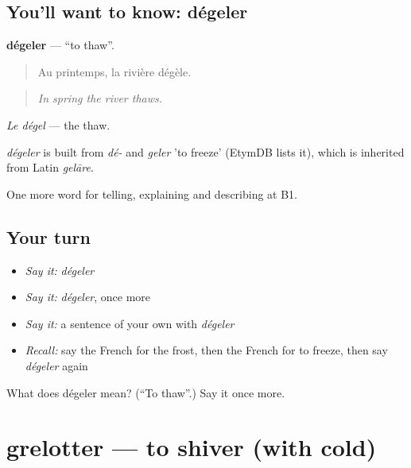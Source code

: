 \subsection*{You'll want to know: dégeler}
\textbf{dégeler} — \textquotedblleft{}to thaw\textquotedblright{}.

\begin{quote}
Au printemps, la rivière dégèle.
\end{quote}

\begin{quote}
\emph{In spring the river thaws.}
\end{quote}

\emph{Le dégel} — the thaw.

\begin{cousinweb}
\emph{dégeler} is built from \emph{dé-} and \emph{geler} 'to freeze' (EtymDB lists it), which is inherited from Latin \emph{gelāre}.
\end{cousinweb}

\begin{grammarlens}[title={What you've built}]
One more word for telling, explaining and describing at B1.
\end{grammarlens}

\subsection*{Your turn}
\begin{itemize}
\raggedright
  \item \emph{Say it:} \emph{dégeler}
  \item \emph{Say it:} \emph{dégeler}, once more
  \item \emph{Say it:} a sentence of your own with \emph{dégeler}
  \item \emph{Recall:} say the French for the frost, then the French for to freeze, then say \emph{dégeler} again
\end{itemize}

\begin{tcolorbox}[breakable,colback=teal!4,colframe=teal!35!black,title={Before you move on}]
What does dégeler mean? (\textquotedblleft{}To thaw\textquotedblright{}.) Say it once more.
\end{tcolorbox}
\section[grelotter]{grelotter — to shiver (with cold)}

\label{lesson:FR-C463-grelotter}



